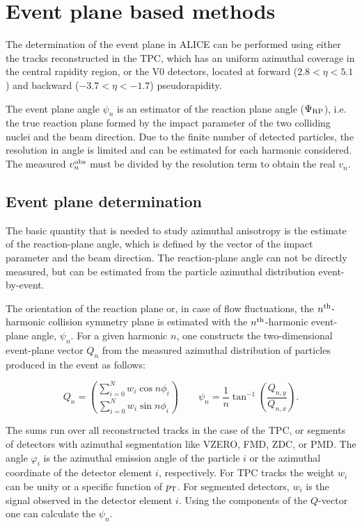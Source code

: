 \section{Event plane based methods}
The determination of the event plane in ALICE can be performed using
either the tracks reconstructed in the TPC, which has an uniform
azimuthal coverage in the central rapidity region, or the V0
detectors, located at forward ($2.8<\eta<5.1$) and backward
($-3.7<\eta<-1.7$) pseudorapidity.

The event plane angle $\psi_n$ is an estimator of the reaction
plane angle ($\Psi_{\rm RP}$), i.e. the true reaction plane formed by
the impact parameter of the two colliding nuclei and the beam
direction. Due to the finite number of detected particles, the
resolution in angle is limited and can be estimated for each harmonic
considered. The measured $v_n^{\rm obs}$ must be divided by the
resolution term to obtain the real $v_n$.

\subsection{Event plane determination}\label{TPCEP}
The basic quantity that is needed to study azimuthal anisotropy is the estimate of the reaction-plane angle, which is defined by the vector of the impact parameter and the beam direction. The reaction-plane angle can not be directly measured, but can be estimated from the particle azimuthal distribution event-by-event. 

The orientation of the reaction plane or, in case of flow fluctuations, the $n^{\rm th}$-harmonic collision symmetry plane is estimated with the $n^{\rm th}$-harmonic event-plane angle, $\psi_n$. For a given harmonic $n$, one constructs the two-dimensional event-plane vector $Q_n$ from the measured azimuthal distribution of particles produced in the event as follows:

\begin{equation}\label{f:qvector}
 Q_n={\sum_{i=0}^{N} w_i \cos n\phi_i \choose \sum_{i=0}^{N} w_i \sin n\phi_i} \qquad \psi_n = \dfrac{1}{n} \tan^{-1} \left(\dfrac{Q_{n,y}}{Q_{n,x}}\right).
\end{equation}

The sums run over all reconstructed tracks in the case of the TPC, or segments of detectors with azimuthal segmentation like VZERO, FMD, ZDC, or PMD. The angle $\varphi_i$ is the azimuthal emission angle of the particle $i$ or the azimuthal coordinate of the detector element $i$, respectively. For TPC tracks the weight $w_i$ can be unity or a specific function of $p_{\rm T}$. For segmented detectors, $w_i$ is the signal observed in the detector element $i$. Using the components of the $Q$-vector one can calculate the $\psi_n$.


